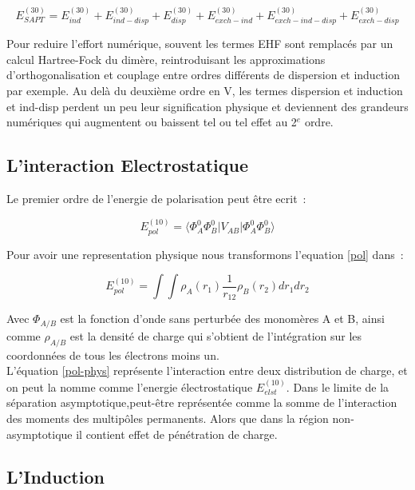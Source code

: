 \begin{equation}
E_{SAPT}^{(30)} = E_{ind}^{(30)} + E_{ind-disp}^{(30)} + E_{disp}^{(30)} + E_{exch-ind}^{(30)} + E_{exch-ind-disp}^{(30)} + E_{exch-disp}^{(30)}
\end{equation}

Pour reduire l’effort numérique, souvent les termes EHF sont remplacés par un calcul Hartree-Fock du dimère, reintroduisant les approximations d’orthogonalisation et couplage entre ordres différents de dispersion et induction par exemple.
Au delà du deuxième ordre en V, les termes dispersion et induction et ind-disp perdent un peu leur signification physique et deviennent des grandeurs numériques qui augmentent ou baissent tel ou tel effet au 2$^{e}$ ordre.

\subsection{L'interaction Electrostatique}


Le premier ordre de l'energie de polarisation peut être ecrit :

\begin{equation}
E_{pol}^{(10)} = \langle \Phi_{A}^{0} \Phi_{B}^{0} |V_{AB}| \Phi_{A}^{0} \Phi_{B}^{0} \rangle  \label{pol}
\end{equation}

Pour avoir une representation physique nous transformons l'equation \ref{pol} dans :

\begin{equation}
E_{pol}^{(10)} = \int \int \rho_{A} (r_{1}) \frac{1}{r_{12}} \rho_{B} (r_{2}) dr_{1} dr_{2} \label{pol-phys}
\end{equation}

Avec $\Phi_{A/B}$ est la fonction d'onde sans perturbée des monomères A et B, ainsi comme $\rho_{A/B}$ est la densité de charge qui s'obtient de l'intégration sur les coordonnées de tous les électrons moins un.\\

L'équation \ref{pol-phys} représente l'interaction entre deux distribution de charge, et on peut la nomme comme l'energie électrostatique $E_{elst}^{(10)}$. Dans le limite de la séparation asymptotique,peut-être représentée comme la somme de l'interaction des moments des multipôles permanents. Alors que dans la région non-asymptotique il contient effet de pénétration de charge.

\subsection{L'Induction}

